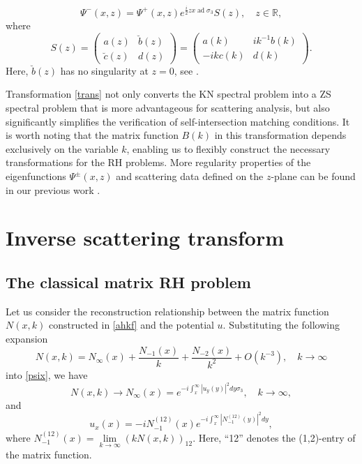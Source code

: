 \documentclass[preprint,compress,12pt]{elsarticle}
\numberwithin{equation}{section}
\begin{document}
\begin{equation}\label{rela}
\Psi^{-}(x,z)=\Psi^{+}(x,z)e^{\frac{i}{2}zx\operatorname{ad}\sigma_{3}}S(z),\quad z\in\mathbb{R},
\end{equation}
where
\begin{equation}
S(z)=\begin{pmatrix}a(z)&\breve{b}(z)\\ \breve{c}(z)&d(z)\end{pmatrix}=\begin{pmatrix}a(k)&ik^{-1}b(k)\\ -ikc(k)&d(k)\end{pmatrix}.
\end{equation}
Here, $\breve{b}(z)$ has no singularity at $z=0$, see \cite{Chengglo}.

Transformation \eqref{trans} not only converts the KN spectral problem into a ZS spectral problem that is more advantageous for scattering analysis, but also significantly simplifies the verification of self-intersection matching conditions. It is worth noting that the matrix function $B(k)$ in this transformation depends exclusively on the variable $k$, enabling us to flexibly construct the necessary transformations for the RH problems. More regularity properties of the eigenfunctions $\Psi^{\pm}(x,z)$ and scattering data defined on the $z$-plane can be found in our previous work \cite{Chengglo}.


\section{Inverse scattering transform}\label{sec3}
\subsection{The classical matrix RH problem}\label{sub31}

Let us consider the reconstruction relationship between the matrix function $N(x,k)$ constructed in \eqref{ahkf} and the potential $u$.  Substituting the following expansion
\begin{equation}\label{exm}
N(x,k)=N_{\infty}(x)+\frac{N_{-1}(x)}{k}+\frac{N_{-2}(x)}{k^{2}}+O(k^{-3}),\quad k\rightarrow\infty
\end{equation}
into \eqref{psix}, we have
\begin{equation}\label{asy}
N(x,k)\rightarrow N_{\infty}(x)=e^{-i\int_{x}^{\infty}|u_{y}(y)|^{2}dy\sigma_{3}},\quad k\rightarrow\infty,
\end{equation}
and
\begin{equation}\label{rei}
u_{x}(x)=-iN_{-1}^{(12)}(x)e^{-i\int_{x}^{\infty}|N_{-1}^{(12)}(y)|^{2}dy},
\end{equation}
where $N_{-1}^{(12)}(x)=\lim\limits_{k\rightarrow\infty}\left(kN(x,k)\right)_{12}$. Here, ``12'' denotes the (1,2)-entry of the matrix function.
\end{document}
